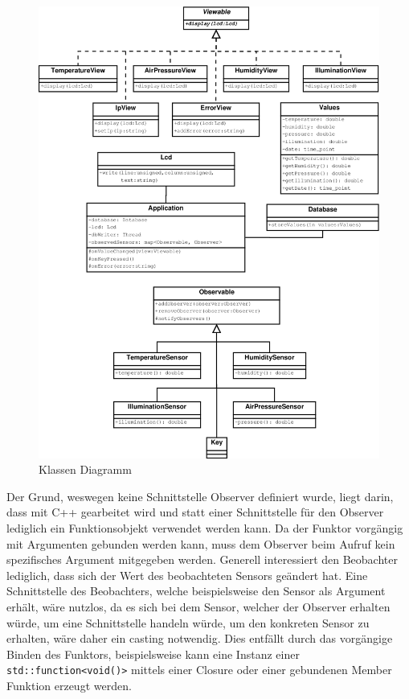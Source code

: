 \documentclass[
    10pt,
    a4paper,
]{scrartcl}
\begin{document}
\begin{figure}[ht]
    \centering
    \includegraphics[width=\textwidth]{class-diagram}
    \caption{Klassen Diagramm}
    \label{fig:class-diagram}
\end{figure}

Der Grund, weswegen keine Schnittstelle Observer definiert wurde, liegt darin, dass mit
C++ gearbeitet wird und statt einer Schnittstelle für den Observer lediglich ein
Funktionsobjekt verwendet werden kann. Da der Funktor vorgängig mit Argumenten gebunden
werden kann, muss dem Observer beim Aufruf kein spezifisches Argument mitgegeben werden.
Generell interessiert den Beobachter lediglich, dass sich der Wert des beobachteten
Sensors geändert hat. Eine Schnittstelle des Beobachters, welche beispielsweise den Sensor
als Argument erhält, wäre nutzlos, da es sich bei dem Sensor, welcher der Observer
erhalten würde, um eine Schnittstelle handeln würde, um den konkreten Sensor zu erhalten,
wäre daher ein casting notwendig. Dies entfällt durch das vorgängige Binden des Funktors,
beispielsweise kann eine Instanz einer \texttt{std::function<void()>} mittels einer
Closure oder einer gebundenen Member Funktion erzeugt werden.
\end{document}
